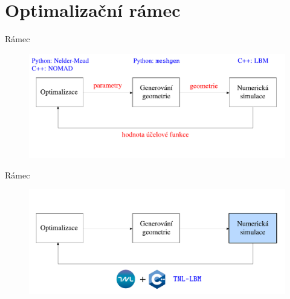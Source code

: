 \documentclass[aspectratio=169,xcolor=dvipsnames]{beamer}
\begin{document}
\section{Optimalizační rámec}
\begin{frame}{Rámec}
	
	\begin{figure}
		\includegraphics[width=0.95\linewidth, trim={0 -0.1cm 0 0}, clip]{Images/framework-cz.pdf}
	\end{figure}
\end{frame}
\begin{frame}{Rámec}
	\addtocounter{framenumber}{-1}
	\begin{figure}
		\includegraphics[width=0.95\linewidth, trim={0 -0.1cm 0 0}, clip]{Images/framework-cz-1.pdf}
	\end{figure}
\end{frame}
\end{document}
